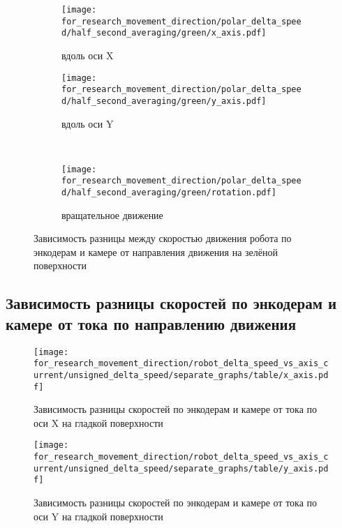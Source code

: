 \begin{figure}[H]
    \centering
    \begin{subfigure}{0.49\textwidth}
        \centering
        \texttt{[image: for\_research\_movement\_direction/polar\_delta\_speed/half\_second\_averaging/green/x\_axis.pdf]}
        \caption{вдоль оси X}
    \end{subfigure}
    \hspace{0.005\textwidth}
    \begin{subfigure}{0.49\textwidth}
        \centering
        \texttt{[image: for\_research\_movement\_direction/polar\_delta\_speed/half\_second\_averaging/green/y\_axis.pdf]}
        \caption{вдоль оси Y}
    \end{subfigure} \\
    \vspace{4pt}
    \centering
    \begin{subfigure}{0.49\textwidth}
        \centering
        \texttt{[image: for\_research\_movement\_direction/polar\_delta\_speed/half\_second\_averaging/green/rotation.pdf]}
        \caption{вращательное движение}
    \end{subfigure}
    \caption{Зависимость разницы между скоростью движения робота по энкодерам и камере от направления движения на зелёной поверхности}
\end{figure}

\subsection{Зависимость разницы скоростей по энкодерам и камере от тока по направлению движения}

\begin{figure}[H]
    \centering
    \texttt{[image: for\_research\_movement\_direction/robot\_delta\_speed\_vs\_axis\_current/unsigned\_delta\_speed/separate\_graphs/table/x\_axis.pdf]}
    \caption{Зависимость разницы скоростей по энкодерам и камере от тока по оси X на гладкой поверхности}
\end{figure}

\begin{figure}[H]
    \centering
    \texttt{[image: for\_research\_movement\_direction/robot\_delta\_speed\_vs\_axis\_current/unsigned\_delta\_speed/separate\_graphs/table/y\_axis.pdf]}
    \caption{Зависимость разницы скоростей по энкодерам и камере от тока по оси Y на гладкой поверхности}
\end{figure}

